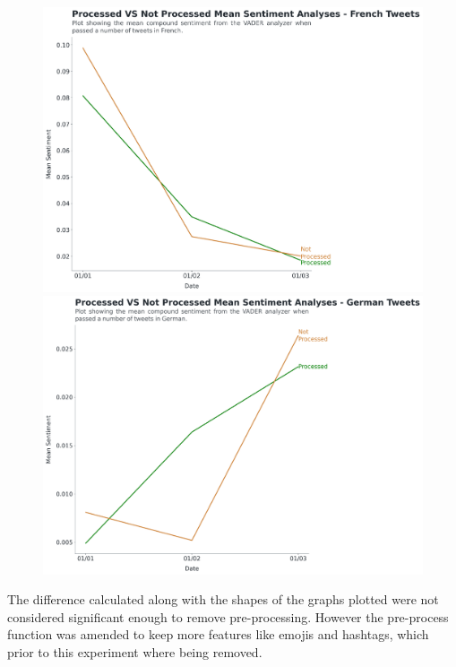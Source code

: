 \begin{landscape}
\begin{figure}[!htb]
  \caption[Spanish Process VS NotProcessed]{ }\label{fig:SpanishPre}
\endminipage
\end{figure}
\begin{figure}[!htb]
  \includegraphics[width=\linewidth]{French Process VS NotProcessed.png}
  \caption[French Process VS NotProcessed]{ }\label{fig:FrenchPre}
\endminipage\hfill
{}
  \includegraphics[width=\linewidth]{German Process VS NotProcessed.png}
  \caption[German Process VS NotProcessed]{ }\label{fig:GermanPre}
\endminipage
\end{figure}

\noindent The difference calculated along with the shapes of the graphs plotted were not considered significant enough to remove pre-processing.
However the pre-process function was amended to keep more features like emojis and hashtags, which prior to this experiment where being removed.


\end{landscape}
